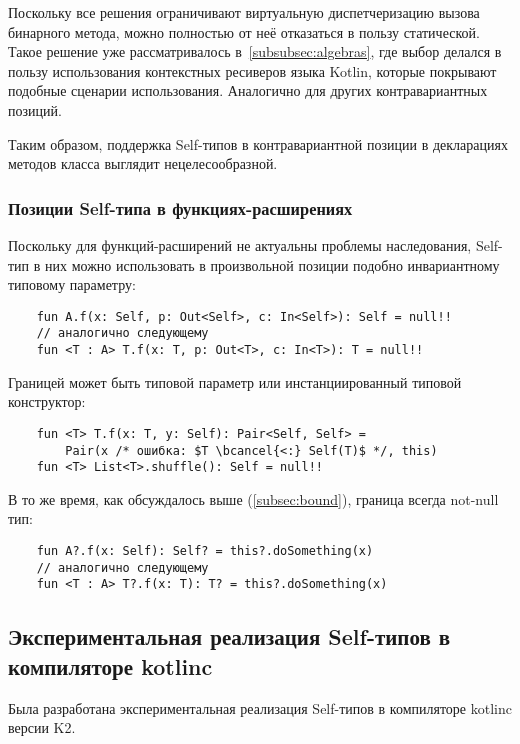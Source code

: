 Поскольку все решения ограничивают виртуальную диспетчеризацию вызова бинарного метода, можно полностью от неё отказаться в пользу статической.
Такое решение уже рассматривалось в~\ref{subsubsec:algebras}, где выбор делался в пользу использования контекстных ресиверов языка Kotlin, которые покрывают подобные сценарии использования.
Аналогично для других контравариантных позиций.

Таким образом, поддержка Self-типов в контравариантной позиции в декларациях методов класса выглядит нецелесообразной.

\subsubsection{Позиции Self-типа в функциях-расширениях} \label{subsubsec:extension-position}

Поскольку для функций-расширений не актуальны проблемы наследования, Self-тип в них можно использовать в произвольной позиции подобно инвариантному типовому параметру:

\begin{verbatim}
    fun A.f(x: Self, p: Out<Self>, c: In<Self>): Self = null!!
    // аналогично следующему
    fun <T : A> T.f(x: T, p: Out<T>, c: In<T>): T = null!!
\end{verbatim}

Границей может быть типовой параметр или инстанциированный типовой конструктор:

\begin{verbatim}
    fun <T> T.f(x: T, y: Self): Pair<Self, Self> =
        Pair(x /* ошибка: $T \bcancel{<:} Self(T)$ */, this)
    fun <T> List<T>.shuffle(): Self = null!!
\end{verbatim}

В то же время, как обсуждалось выше (\ref{subsec:bound}), граница всегда not-null тип:

\begin{verbatim}
    fun A?.f(x: Self): Self? = this?.doSomething(x)
    // аналогично следующему
    fun <T : A> T?.f(x: T): T? = this?.doSomething(x)
\end{verbatim}


\subsection{Экспериментальная реализация Self-типов в компиляторе kotlinc}

Была разработана экспериментальная реализация Self-типов в компиляторе kotlinc версии K2.

